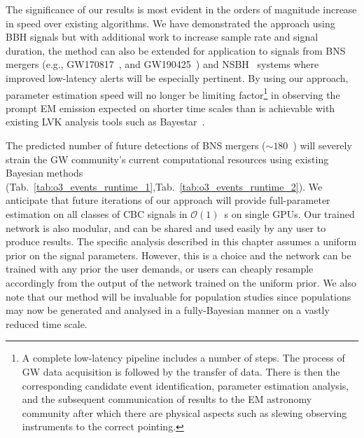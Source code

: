 %
%
The significance of our results is most evident in the orders of magnitude increase in 
speed over existing algorithms. We have demonstrated the approach using \ac{BBH} 
signals but with additional work to increase sample rate and signal duration, the method 
can also be extended for application to signals from \ac{BNS} mergers (e.g.,
GW170817~\cite{PhysRevLett.119.161101}, and GW190425~\cite{2020ApJ...892L...3A}) and
\ac{NSBH}~\cite{Abbott_2021} systems where improved low-latency alerts will be especially 
pertinent. By using our approach, parameter estimation speed will no longer be limiting
factor\footnote{A complete low-latency pipeline includes a number of steps. The 
process of \ac{GW} data acquisition is followed by the transfer of data. There is then the 
corresponding candidate event identification, parameter estimation analysis, and the 
subsequent communication of results to the \ac{EM} astronomy community after which there 
are physical aspects such as slewing observing instruments to the correct pointing.} 
in observing the prompt \ac{EM} emission expected on shorter time scales than 
is achievable with existing \ac{LVK} analysis tools such as Bayestar~\cite{2016PhRvD..93b4013S}.

%
%
The predicted number of future detections of \ac{BNS} mergers 
($\sim 180$~\cite{2018LRR....21....3A}) will severely strain the \ac{GW} community's 
current computational resources using existing Bayesian methods
(Tab.~\ref{tab:o3_events_runtime_1},Tab.~\ref{tab:o3_events_runtime_2}). We 
anticipate that future iterations of our approach will provide full-parameter 
estimation on all classes of \ac{CBC} signals in $\mathcal{O}(1)$~s on single \acp{GPU}. Our 
trained network is also modular, and can be shared and used easily by any user to produce 
results. The specific analysis described in this chapter assumes a uniform 
prior on the signal parameters. However, this is a choice and the network can be 
trained with any prior the user demands, or users can cheaply resample accordingly 
from the output of the network trained on the uniform prior. We also note that 
our method will be invaluable for population studies since populations may now be generated and analysed in a fully-Bayesian manner on a vastly reduced time scale. 

